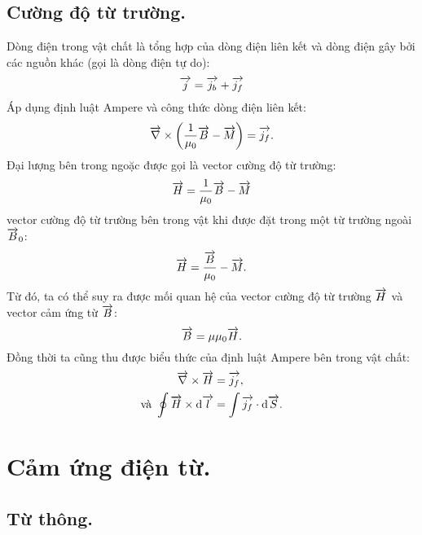 \begin{appendices}
\subsection{Cường độ từ trường.}
    Dòng điện trong vật chất là tổng hợp của dòng điện liên kết và dòng điện gây bởi các nguồn khác (gọi là dòng điện tự do):
    $$\ot{j}=\ot{j_b}+\ot{j_f}$$
    Áp dụng định luật Ampere và công thức dòng điện liên kết:
    $$\ot{\nabla}\times\left(\dfrac{1}{\mu_0}\ot{B}-\ot{M}\right)=\ot{j_f}.$$
    Đại lượng bên trong ngoặc được gọi là vector cường độ từ trường:
    $$\ot{H}=\dfrac{1}{\mu_0}\ot{B}-\ot{M}$$
    vector cường độ từ trường bên trong vật khi được đặt trong một từ trường ngoài $\ot{B}_{0}$:
    $$\ot{H} = 
      \dfrac{\ot{B}}{\mu_0}-\ot{M}.$$
     Từ đó, ta có thể suy ra được mối quan hệ của vector cường độ từ trường $\ot{H}$ và vector cảm ứng từ $\ot{B}$:
     $$\ot{B} = 
      \mu\mu_0\ot{H}.$$
    Đồng thời ta cũng thu được biểu thức của định luật Ampere bên trong vật chất:
    \begin{align*}
        \ot{\nabla}\times\ot{H}&=\ot{j_f},\\
        \text{và } \oint\ot{H}\times\dd \ot{l}&=\int\ot{j_f}\cdot\dd \ot{S}.
     \end{align*}
\section{Cảm ứng điện từ.}
\subsection{Từ thông.}
\begin{center}
    

 
\tikzset{
pattern size/.store in=\mcSize, 
pattern size = 5pt,
pattern thickness/.store in=\mcThickness, 
pattern thickness = 0.3pt,
pattern radius/.store in=\mcRadius, 
pattern radius = 1pt}
\makeatletter
{}
\makeatother
{} %

\begin{tikzpicture}[x=0.75pt,y=0.75pt,yscale=-1,xscale=1]


\end{tikzpicture}
\end{center}
\end{appendices}
